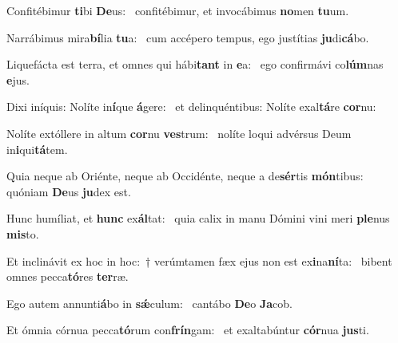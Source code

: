 \item Confitébimur \textbf{ti}bi \textbf{De}us:~\psstar{} confitébimur, et invocábimus \textbf{no}men \textbf{tu}um.
\item Narrábimus mira\textbf{bí}lia \textbf{tu}a:~\psstar{} cum accépero tempus, ego justítias \textbf{ju}di\textbf{cá}bo.
\item Liquefácta est terra, et omnes qui hábi\textbf{tant} in \textbf{e}a:~\psstar{} ego confirmávi co\textbf{lúm}nas \textbf{e}jus.
\item Dixi iníquis: Nolíte in\textbf{í}que \textbf{á}gere:~\psstar{} et delinquéntibus: Nolíte exal\textbf{tá}re \textbf{cor}nu:
\item Nolíte extóllere in altum \textbf{cor}nu \textbf{ves}trum:~\psstar{} nolíte loqui advérsus Deum in\textbf{i}qui\textbf{tá}tem.
\item Quia neque ab Oriénte, neque ab Occidénte, neque a de\textbf{sér}tis \textbf{món}tibus:~\psstar{} quóniam \textbf{De}us \textbf{ju}dex est.
\item Hunc humíliat, et \textbf{hunc} ex\textbf{ál}tat:~\psstar{} quia calix in manu Dómini vini meri \textbf{ple}nus \textbf{mis}to.
\item Et inclinávit ex hoc in hoc:~† verúmtamen fæx ejus non est ex\textbf{i}na\textbf{ní}ta:~\psstar{} bibent omnes pecca\textbf{tó}res \textbf{ter}ræ.
\item Ego autem annunti\textbf{á}bo in \textbf{sǽ}culum:~\psstar{} cantábo \textbf{De}o \textbf{Ja}cob.
\item Et ómnia córnua pecca\textbf{tó}rum con\textbf{frín}gam:~\psstar{} et exaltabúntur \textbf{cór}nua \textbf{jus}ti.
